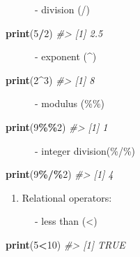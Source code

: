 \documentclass[
]{book}
\newenvironment{Shaded}{\begin{snugshade}}{\end{snugshade}}
\newcommand{\CommentTok}[1]{\textcolor[rgb]{0.56,0.35,0.01}{\textit{#1}}}
\newcommand{\DecValTok}[1]{\textcolor[rgb]{0.00,0.00,0.81}{#1}}
\newcommand{\FunctionTok}[1]{\textcolor[rgb]{0.13,0.29,0.53}{\textbf{#1}}}
\newcommand{\NormalTok}[1]{#1}
\newcommand{\SpecialCharTok}[1]{\textcolor[rgb]{0.81,0.36,0.00}{\textbf{#1}}}
\providecommand{\tightlist}{%
  \setlength{\itemsep}{0pt}\setlength{\parskip}{0pt}}
\begin{document}
~~~~~~- division (/)

\begin{Shaded}
\begin{Highlighting}[]
\FunctionTok{print}\NormalTok{(}\DecValTok{5}\SpecialCharTok{/}\DecValTok{2}\NormalTok{)}
\CommentTok{\#\textgreater{} [1] 2.5}
\end{Highlighting}
\end{Shaded}

~~~~~~- exponent (\^{})

\begin{Shaded}
\begin{Highlighting}[]
\FunctionTok{print}\NormalTok{(}\DecValTok{2}\SpecialCharTok{\^{}}\DecValTok{3}\NormalTok{)}
\CommentTok{\#\textgreater{} [1] 8}
\end{Highlighting}
\end{Shaded}

~~~~~~- modulus (\%\%)

\begin{Shaded}
\begin{Highlighting}[]
\FunctionTok{print}\NormalTok{(}\DecValTok{9}\SpecialCharTok{\%\%}\DecValTok{2}\NormalTok{)}
\CommentTok{\#\textgreater{} [1] 1}
\end{Highlighting}
\end{Shaded}

~~~~~~- integer division(\%/\%)

\begin{Shaded}
\begin{Highlighting}[]
\FunctionTok{print}\NormalTok{(}\DecValTok{9}\SpecialCharTok{\%/\%}\DecValTok{2}\NormalTok{)}
\CommentTok{\#\textgreater{} [1] 4}
\end{Highlighting}
\end{Shaded}

\begin{enumerate}
\def\labelenumi{\arabic{enumi}.}
\setcounter{enumi}{1}
\tightlist
\item
  Relational operators:
\end{enumerate}

~~~~~~- less than (\textless)

\begin{Shaded}
\begin{Highlighting}[]
\FunctionTok{print}\NormalTok{(}\DecValTok{5}\SpecialCharTok{\textless{}}\DecValTok{10}\NormalTok{)}
\CommentTok{\#\textgreater{} [1] TRUE}
\end{Highlighting}
\end{Shaded}
\end{document}
